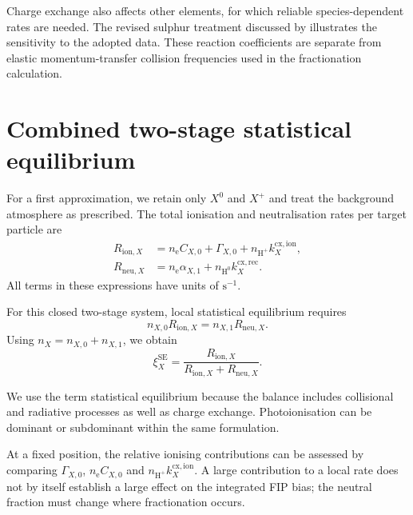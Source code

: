 \documentclass[a4paper,10pt,twoside,openany]{book}
\newcommand{\ChapColor}{Cap1Blue}
\newcommand{\ChapColorLight}{LightBlue}
\newenvironment{definition}[1]{%
  \begin{tcolorbox}[notebox,
    colback=\ChapColorLight,colframe=\ChapColor,
    colbacktitle=\ChapColor,coltitle=white,
    title={Definition: #1}]}{\end{tcolorbox}}
\begin{document}
Charge exchange also affects other elements, for which reliable
species-dependent rates are needed. The revised sulphur treatment discussed by
\cite{laming2021} illustrates the sensitivity to the adopted data.
These reaction coefficients are separate from elastic momentum-transfer
collision frequencies used in the fractionation calculation.

\section{Combined two-stage statistical equilibrium}
\label{subsec:ion_two_stage}

For a first approximation, we retain only \(X^0\) and \(X^+\) and treat the
background atmosphere as prescribed. The total ionisation and neutralisation
rates per target particle are
\begin{align}
 R_{\mathrm{ion},X}
 &=n_{\mathrm e}C_{X,0}+\Gamma_{X,0}
   +n_{\mathrm{H^+}}k_X^{\mathrm{cx,ion}},
 \label{eq:ion_combined_forward}\\
 R_{\mathrm{neu},X}
 &=n_{\mathrm e}\alpha_{X,1}
   +n_{\mathrm{H^0}}k_X^{\mathrm{cx,rec}}.
 \label{eq:ion_combined_reverse}
\end{align}
All terms in these expressions have units of \(\mathrm{s^{-1}}\).
\begin{definition}{Two-stage statistical equilibrium}
For this closed two-stage system, local statistical equilibrium requires
\begin{equation}
 n_{X,0}R_{\mathrm{ion},X}
 =n_{X,1}R_{\mathrm{neu},X}.
 \label{eq:ion_balance_two}
\end{equation}
Using \(n_X=n_{X,0}+n_{X,1}\), we obtain
\begin{equation}
 \xi_X^{\mathrm{SE}}
 =\frac{R_{\mathrm{ion},X}}
 {R_{\mathrm{ion},X}+R_{\mathrm{neu},X}}.
 \label{eq:ion_fraction_two}
\end{equation}
\end{definition}
We use the term statistical equilibrium because the balance includes
collisional and radiative processes as well as charge exchange.
Photoionisation can be dominant or subdominant within the same formulation.

At a fixed position, the relative ionising contributions can be assessed by
comparing \(\Gamma_{X,0}\), \(n_{\mathrm e}C_{X,0}\) and
\(n_{\mathrm{H^+}}k_X^{\mathrm{cx,ion}}\). A large contribution to a local
rate does not by itself establish a large effect on the integrated FIP bias;
the neutral fraction must change where fractionation occurs.
\end{document}
